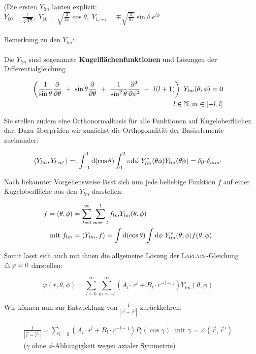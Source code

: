 (Die ersten $Y_{lm}$ lauten explizit: $Y_{00} = \frac{1}{\sqrt{4\pi}}, \; Y_{10} = \sqrt{\frac{3}{4\pi}}\cos\theta, \; Y_{1,\pm1} = \mp \sqrt{\frac{3}{8\pi}}\sin\theta \ e^{i\phi}$\
\\
\ \\
\underline{Bemerkung zu den $Y_{lm}$:}\
\\
\ \\
Die $Y_{lm}$ sind sogenannte \textbf{Kugelflächenfunktionen} und Lösungen der Differentialgleichung

\begin{align*}
\left(\frac{1}{\sin\theta}\pdiff{}{\theta} \ + \ \sin\theta \pdiff{}{\theta} \ + \ \frac{1}{\sin^2\theta} \pddiff{}{\phi} \ + \ l(l+1)\right) \ Y_{lm}(\theta,\phi) = 0\\
l \in \mathbb{N}, m \in [-l,l]
\end{align*}

Sie stellen zudem eine Orthonormalbasis für alle Funktionen auf Kugeloberflächen dar. Dazu überprüfen wir zunächst die Orthogonalität der Basiselemente zueinander:

\begin{equation*}
\langle Y_{lm},Y_{l'm'}\rangle =: \int_{-1}^1\mathrm{d}(\cos\theta)\int_{0}^2\pi\mathrm{d}\phi \ Y^{*}_{lm}(\theta\phi) Y_{lm}(\theta\phi) = \delta_{ll'}\delta_{mm'}
\end{equation*}

Nach bekannter Vorgehensweise lässt sich nun jede beliebige Funktion $f$ auf einer Kugeloberfläche aus den $Y_{lm}$ darstellen:

\begin{align*}
f = (\theta,\phi) &= \sum_{l=0}^{\infty} \sum_{m=-l}^{l} f_{lm} Y_{lm}(\theta,\phi)\\
\text{mit } f_{lm} &= \langle Y_{lm},f\rangle = \int\mathrm{d}(\cos\theta) \int\mathrm{d}\phi \ Y^{*}_{lm}(\theta,\phi)f(\theta,\phi)
\end{align*}

Somit lässt sich auch mit ihnen die allgemeine Lösung der \textsc{Laplace}-Gleichung $\mathop{{}\bigtriangleup}\nolimits\varphi=0$ darstellen: 

\begin{equation*}
\varphi(r,\theta,\phi) = \sum_{l=0}^{\infty}\sum_{m=-l}^{\infty} \left(A_l \cdot r^l + B_l \cdot r^{-l-1}\right) Y_{lm}(\theta,\phi)
\end{equation*}

Wir können nun zur Entwicklung von $\frac{1}{|\vec{r} - \vec{r}'|}$ zurückkehren:

\begin{align*}
\frac{1}{|\vec{r} - \vec{r}'|} = \sum_{l=0} \left(A_l \cdot r^l + B_l \cdot r^{-l-1}\right) P_l(\cos\gamma) \; \text{ mit } \gamma = \angle\left(\vec{r},\vec{r}'\right)\\
(\gamma\text{ ohne $\phi$-Abhängigkeit wegen axialer Symmetrie)}
\end{align*}

